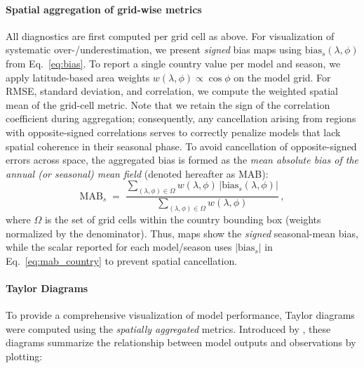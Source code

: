 \documentclass[pdflatex,sn-chicago]{sn-jnl}%
\theoremstyle{thmstyleone}%
\theoremstyle{thmstyletwo}%
\theoremstyle{thmstylethree}%
\begin{document}
\paragraph{\textbf{Spatial aggregation of grid-wise metrics}}\label{para:spatial-agg}
All diagnostics are first computed per grid cell as above. For visualization of systematic over-/underestimation, we present \emph{signed} bias maps using \(\text{bias}_s(\lambda,\phi)\) from Eq.~\eqref{eq:bias}. To report a single country value per model and season, we apply latitude-based area weights \(w(\lambda,\phi)\propto \cos\phi\) on the model grid. For RMSE, standard deviation, and correlation, we compute the weighted spatial mean of the grid-cell metric. Note that we retain the sign of the correlation coefficient during aggregation; consequently, any cancellation arising from regions with opposite-signed correlations serves to correctly penalize models that lack spatial coherence in their seasonal phase. To avoid cancellation of opposite-signed errors across space, the aggregated bias is formed as the \emph{mean absolute bias of the annual (or seasonal) mean field} (denoted hereafter as MAB):
\begin{equation}
\label{eq:mab_country}
\mathrm{MAB}_{s}
\;=\;
\frac{\displaystyle \sum_{(\lambda,\phi)\in\Omega} w(\lambda,\phi)\,
\bigl|\text{bias}_s(\lambda,\phi)\bigr|}
{\displaystyle \sum_{(\lambda,\phi)\in\Omega} w(\lambda,\phi)} \, ,
\end{equation}
where \(\Omega\) is the set of grid cells within the country bounding box (weights normalized by the denominator). Thus, maps show the \emph{signed} seasonal-mean bias, while the scalar reported for each model/season uses \(|\text{bias}_s|\) in Eq.~\eqref{eq:mab_country} to prevent spatial cancellation.


\paragraph{\textbf{Taylor Diagrams}} To provide a comprehensive visualization of model performance, Taylor diagrams were computed using the \emph{spatially aggregated} metrics. Introduced by \citet{Taylor2001}, these diagrams summarize the relationship between model outputs and observations by plotting:
\end{document}

